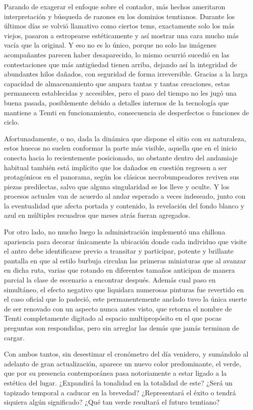 \documentclass[
]{book}
\begin{document}
Parando de exagerar el enfoque sobre el contador, más hechos ameritaron interpretación y búsqueda de razones en los dominios temtianos. Durante los últimos días se volvió llamativo como ciertos tems, exactamente solo los más viejos, pasaron a estropearse estéticamente y así mostrar una cara mucho más vacía que la original. Y eso no es lo único, porque no solo las imágenes acompañantes parecen haber desaparecido, lo mismo ocurrió sucedió en las contestaciones que más antigüedad tienen arriba, dejando así la integridad de abundantes hilos dañados, con seguridad de forma irreversible. Gracias a la larga capacidad de almacenamiento que ampara tantas y tantas creaciones, estas permanecen establecidas y accesibles, pero el paso del tiempo no les jugó una buena pasada, posiblemente debido a detalles internos de la tecnología que mantiene a Temti en funcionamiento, consecuencia de desperfectos o funciones de ciclo.

Afortunadamente, o no, dada la dinámica que dispone el sitio con su naturaleza, estos huecos no suelen conformar la parte más visible, aquella que en el inicio conecta hacia lo recientemente posicionado, no obstante dentro del andamiaje habitual también está implícito que los dañados en cuestión regresen a ser protagónicos en el panorama, según los clásicos necrobumpeadores reviven sus piezas predilectas, salvo que alguna singularidad se los lleve y oculte. Y los procesos actuales van de acuerdo al andar esperado a veces indeseado, junto con la eventualidad que afecta portada y contenido, la revelación del fondo blanco y azul en múltiples recuadros que meses atrás fueran agregados.

Por otro lado, no mucho luego la administración implementó una chillona apariencia para decorar únicamente la ubicación donde cada individuo que visite el antro debe identificarse previo a transitar y participar, potente y brillante pantalla en que al estilo burbuja circulan las primeras miniaturas que al avanzar en dicha ruta, varias que rotando en diferentes tamaños anticipan de manera parcial la clase de escenario a encontrar después. Además cual paso en simultáneo, el efecto negativo que liquidara numerosas pinturas fue revertido en el caso oficial que lo padeció, este permanentemente anclado tuvo la única suerte de ser renovado con un aspecto nunca antes visto, que retorna el nombre de Temti completamente digitado al espacio multipropósito en el que pocas preguntas son respondidas, pero sin arreglar las demás que jamás terminan de cargar.

Con ambos tantos, sin desestimar el cronómetro del día venidero, y sumándolo al adelanto de gran actualización, aparece un nuevo color predominante, el verde, que por su presencia contemporánea pasa notoriamente a estar ligado a la estética del lugar. ¿Expandirá la tonalidad en la totalidad de este? ¿Será un tapizado temporal a caducar en la brevedad? ¿Representará el éxito o tendrá siquiera algún significado? ¿Qué tan verde resultará el futuro temtiano?
\end{document}
